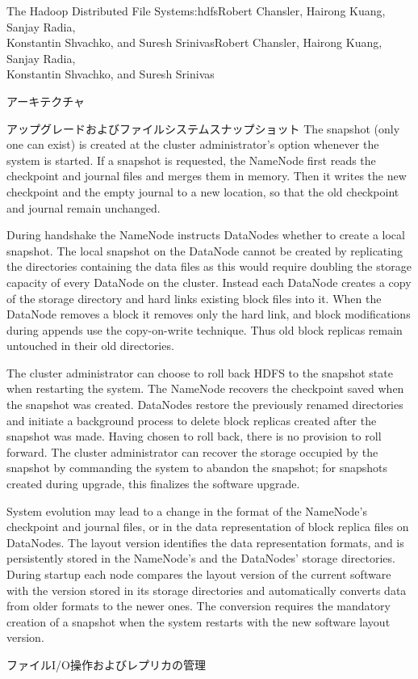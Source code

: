 \begin{aosachaptertoc}{The Hadoop Distributed File System}{s:hdfs}{Robert Chansler, Hairong Kuang, Sanjay Radia, \\ Konstantin Shvachko, and Suresh Srinivas}{Robert Chansler, Hairong Kuang, Sanjay Radia, \\ \hspace*{0.9cm} Konstantin Shvachko, and Suresh Srinivas}
\begin{aosasect1}{アーキテクチャ}
\begin{aosasect2}{アップグレードおよびファイルシステムスナップショット}
The snapshot (only one can exist) is created at the cluster
administrator's option whenever the system is started. If a snapshot
is requested, the NameNode first reads the checkpoint and journal
files and merges them in memory. Then it writes the new checkpoint and
the empty journal to a new location, so that the old checkpoint and
journal remain unchanged.

During handshake the NameNode instructs DataNodes whether to create a
local snapshot. The local snapshot on the DataNode cannot be created
by replicating the directories containing the data files as this would require
doubling the storage capacity of every DataNode on the
cluster. Instead each DataNode creates a copy of the storage directory
and hard links existing block files into it. When the DataNode removes
a block it removes only the hard link, and block modifications during
appends use the copy-on-write technique.  Thus old block replicas
remain untouched in their old directories.

The cluster administrator can choose to roll back HDFS to the snapshot
state when restarting the system. The NameNode recovers the checkpoint
saved when the snapshot was created. DataNodes restore the previously
renamed directories and initiate a background process to delete block
replicas created after the snapshot was made. Having chosen to roll
back, there is no provision to roll forward. The cluster administrator
can recover the storage occupied by the snapshot by commanding the
system to abandon the snapshot; for snapshots created during upgrade,
this finalizes the software upgrade.

System evolution may lead to a change in the format of the NameNode's
checkpoint and journal files, or in the data representation of block
replica files on DataNodes. The layout version identifies the data
representation formats, and is persistently stored in the NameNode's
and the DataNodes' storage directories. During startup each node
compares the layout version of the current software with the version
stored in its storage directories and automatically converts data from
older formats to the newer ones. The conversion requires the mandatory
creation of a snapshot when the system restarts with the new software
layout version.

\end{aosasect2}

\end{aosasect1}

\begin{aosasect1}{ファイルI/O操作およびレプリカの管理}


\end{aosasect1}
\end{aosachaptertoc}
